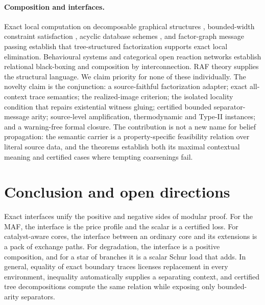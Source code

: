 \documentclass[11pt,a4paper]{article}
\theoremstyle{plain}
\theoremstyle{definition}
\theoremstyle{remark}
\begin{document}
\paragraph{Composition and interfaces.} Exact local computation on decomposable graphical structures \cite{lauritzen1988}, bounded-width constraint satisfaction \cite{freuder1990}, acyclic database schemes \cite{beeri1983}, and factor-graph message passing \cite{kschischang2001} establish that tree-structured factorization supports exact local elimination. Behavioural systems \cite{willems2007} and categorical open reaction networks \cite{baezpollard2017} establish relational black-boxing and composition by interconnection. RAF theory \cite{hordijk2014,steel2019} supplies the structural language. We claim priority for none of these individually. The novelty claim is the conjunction: a source-faithful factorization adapter; exact all-context trace semantics; the realized-image criterion; the isolated locality condition that repairs existential witness gluing; certified bounded separator-message arity; source-level amplification, thermodynamic and Type-II instances; and a warning-free formal closure. The contribution is not a new name for belief propagation: the semantic carrier is a property-specific feasibility relation over literal source data, and the theorems establish both its maximal contextual meaning and certified cases where tempting coarsenings fail.

\section{Conclusion and open directions}\label{sec:conclusion}

Exact interfaces unify the positive and negative sides of modular proof. For the MAF, the interface is the price profile and the scalar is a certified loss. For catalyst-aware cores, the interface between an ordinary core and its extensions is a pack of exchange paths. For degradation, the interface is a positive composition, and for a star of branches it is a scalar Schur load that adds. In general, equality of exact boundary traces licenses replacement in every environment, inequality automatically supplies a separating context, and certified tree decompositions compute the same relation while exposing only bounded-arity separators.
\end{document}
